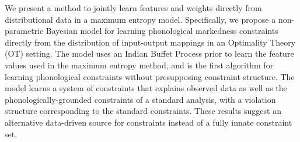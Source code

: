 We present a method to jointly learn features and weights directly from distributional data in a maximum entropy model. Specifically, we propose a non-parametric Bayesian model for learning phonological markedness constraints directly from the distribution of input-output mappings in an Optimality Theory (OT) setting. The model uses an Indian Buffet Process prior to learn the feature values used in the maximum entropy method, and is the first algorithm for learning phonological constraints without presupposing constraint structure. The model learns a system of constraints that explains observed data as well as the phonologically-grounded constraints of a standard analysis, with a violation structure corresponding to the standard constraints.  These results suggest an alternative data-driven source for constraints instead of a fully innate constraint set.
